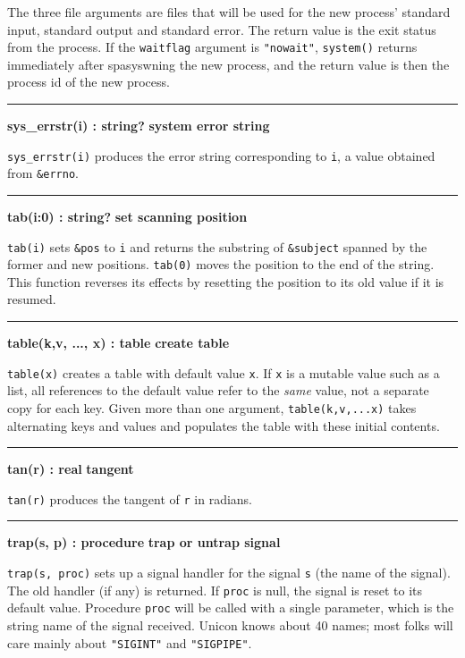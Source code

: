 The three file arguments are files that will be used for the new
process' standard input, standard output and standard
error. The return value is the exit status from the process. If the
\texttt{waitflag} argument is
\texttt{"nowait"}, \texttt{system()}
returns immediately after spasyswning the new process, and the return
value is then the process id of the new process.

\bigskip\hrule\vspace{0.1cm}
\noindent
{\bf sys\_errstr(i) : string? } \hfill {\bf system error string}

\noindent
{}\texttt{sys\_errstr(i)} produces the error string
corresponding to \texttt{i}, a value obtained from \texttt{\&errno}.

\bigskip\hrule\vspace{0.1cm}
\noindent
{\bf tab(i:0) : string? } \hfill {\bf set scanning position}

\noindent
{}\texttt{tab(i)} sets \texttt{\&pos} to \texttt{i} and
returns the substring of \texttt{\&subject} spanned by the former and
new positions. \texttt{tab(0)} moves the position to the end of the
string. This function reverses its effects by resetting the position to
its old value if it is resumed.

\bigskip\hrule\vspace{0.1cm}
\noindent
{\bf table(k,v, ..., x) : table } \hfill {\bf create table}

\noindent
{}\texttt{table(x)} creates a table with default value
\texttt{x}. If \texttt{x} is a mutable value such as a list, all
references to the default value refer to the \textit{same} value, not a
separate copy for each key. Given more than one argument,
\texttt{table(k,v,...x)} takes alternating keys and values and
populates the table with these initial contents.

\bigskip\hrule\vspace{0.1cm}
\noindent
{\bf tan(r) : real } \hfill {\bf tangent}

\noindent
{}\texttt{tan(r)} produces the tangent of \texttt{r} in
radians.

\bigskip\hrule\vspace{0.1cm}
\noindent
{\bf trap(s, p) : procedure } \hfill {\bf trap or untrap signal}

\noindent
{}\texttt{trap(s, proc)} sets up a signal handler for
the signal \texttt{s} (the name of the signal). The old handler (if
any) is returned. If \texttt{proc} is null, the signal is reset to its
default value. Procedure \texttt{proc} will be called with a single parameter,
which is the string name of the signal received. Unicon knows about 40
names; most folks will care mainly about
\texttt{"SIGINT"} and \texttt{"SIGPIPE"}.

